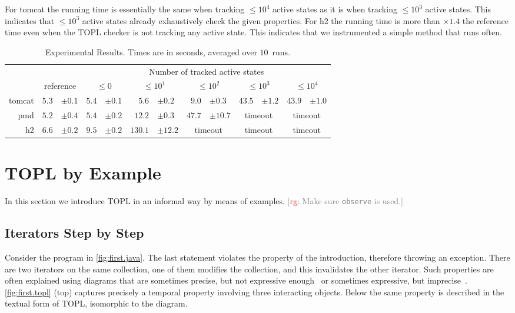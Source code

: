 \documentclass[10pt, preprint]{sigplanconf} %
\newcommand{\noterg}[2]{\textcolor{gray}{[\textcolor{red}{#1}: #2]}}
\newcommand{\rg}[1]{\noterg{rg}{#1}}
\begin{document}
For tomcat the running time is essentially the same when tracking $\le10^4$ active states as it is when tracking $\le10^3$ active states.
This indicates that $\le10^3$ active states already exhaustively check the given properties.
For h2 the running time is more than $\times1.4$ the reference time even when the TOPL checker is not tracking any active state.
This indicates that we instrumented a simple method that runs often.

\begin{table*}[t]\centering
\begin{tabular}{@{}rr@{}lr@{}lr@{}lr@{}lr@{}lr@{}l}
  &&
  & \multicolumn{10}{c}{Number of tracked active states} \\ \cmidrule{4-13}
& \multicolumn{2}{c}{reference}
  &\multicolumn{2}{c}{$\le0$}
  &\multicolumn{2}{c}{$\le10^1$}
  &\multicolumn{2}{c}{$\le10^2$}
  &\multicolumn{2}{c}{$\le10^3$}
  &\multicolumn{2}{c}{$\le10^4$} \\ \midrule
tomcat
  & $5.3$ & $\pm0.1$
  & $5.4$ & $\pm0.1$
  & $5.6$ & $\pm0.2$
  & $9.0$ & $\pm0.3$
  & $43.5$ & $\pm1.2$
  & $43.9$ & $\pm1.0$ \\
pmd
  & $5.2$ & $\pm0.4$
  & $5.4$ & $\pm0.2$
  & $12.2$ & $\pm0.3$
  & $47.7$ & $\pm10.7$
  & \multicolumn{2}{c}{timeout}
  & \multicolumn{2}{c}{timeout}
  \\
h2
  & $6.6$ & $\pm0.2$
  & $9.5$ & $\pm0.2$
  & $130.1$ & $\pm12.2$
  & \multicolumn{2}{c}{timeout}
  & \multicolumn{2}{c}{timeout}
  & \multicolumn{2}{c}{timeout}
  \\
\end{tabular}
\caption{
  Experimental Results.
  Times are in seconds, averaged over $10$~runs.
}\label{table:overhead}
\end{table*}

\section{TOPL by Example} \label{sec:examples} %

In this section we introduce TOPL in an informal way by means of examples.
\rg{Make sure {\tt observe} is used.}

\subsection{Iterators Step by Step} \label{sec:examples.steps} %

Consider the program in \autoref{fig:first.java}. The last statement violates the property of the introduction, therefore throwing an exception.
There are two iterators on the same collection, one of them modifies the collection, and this invalidates the other iterator.
Such properties are often explained using diagrams that are sometimes precise, but not expressive enough~\cite{dblp:journals/scp/FieldGRY05,dblp:conf/issta/FinkYDRG06} or sometimes expressive, but imprecise~\cite{dblp:conf/oopsla/bierhoffa07,dblp:conf/oopsla/naeeml08,dblp:conf/sigsoft/boddenlh08,dblp:conf/ecoop/bierhoffba09}.
\autoref{fig:first.topl} (top)  captures precisely a temporal property involving three interacting objects.
Below the same property is described in the textual form of TOPL, isomorphic to the diagram.
\end{document}
